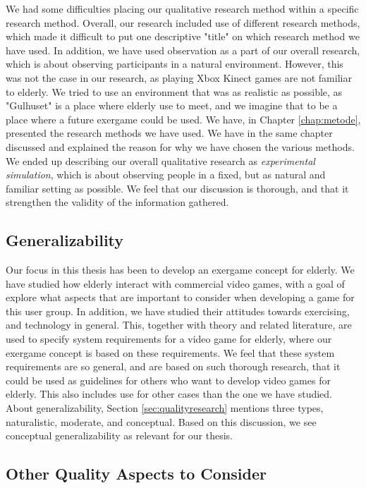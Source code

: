 We had some difficulties placing our qualitative research method within a specific research method. Overall, our research included use of different research methods, which made it difficult to put one descriptive "title" on which research method we have used. In addition, we have used observation as a part of our overall research, which is about observing participants in a natural environment. However, this was not the case in our research, as playing Xbox Kinect games are not familiar to elderly. We tried to use an environment that was as realistic as possible, as "Gulhuset" is a place where elderly use to meet, and we imagine that to be a place where a future exergame could be used. We have, in Chapter \ref{chap:metode}, presented the research methods we have used. We have in the same chapter discussed and explained the reason for why we have chosen the various methods. We ended up describing our overall qualitative research as \emph{experimental simulation}, which is about observing people in a fixed, but as natural and familiar setting as possible. We feel that our discussion is thorough, and that it strengthen the validity of the information gathered. 
    
\subsection{Generalizability}    
Our focus in this thesis has been to develop an exergame concept for elderly. We have studied how elderly interact with commercial video games, with a goal of explore what aspects that are important to consider when developing a game for this user group. In addition, we have studied their attitudes towards exercising, and technology in general. This, together with theory and related literature, are used to specify system requirements for a video game for elderly, where our exergame concept is based on these requirements. We feel that these system requirements are so general, and are based on such thorough research, that it could be used as guidelines for others who want to develop video games for elderly. This also includes use for other cases than the one we have studied. About generalizability, Section \ref{sec:qualityresearch} mentions three types, naturalistic, moderate, and conceptual. Based on this discussion, we see conceptual generalizability as relevant for our thesis.    


\subsection{Other Quality Aspects to Consider}

